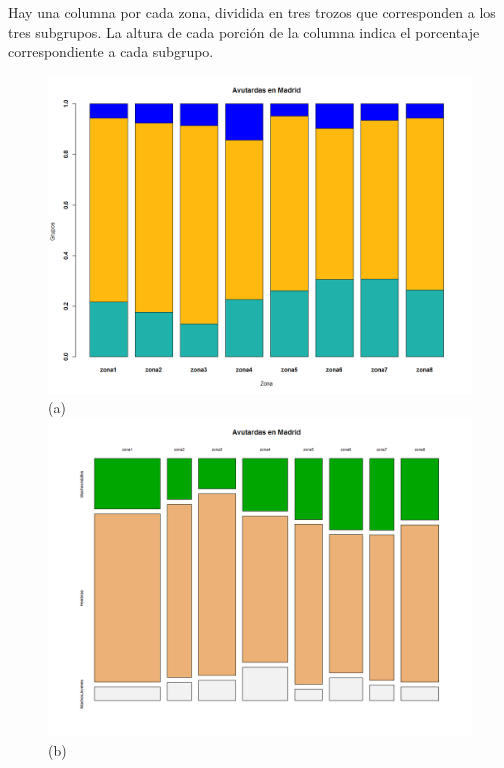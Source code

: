 \begin{Ejemplo}
Hay una columna por cada zona, dividida en tres trozos que corresponden a los tres subgrupos. La altura de cada porción de la columna indica el porcentaje correspondiente a cada subgrupo.
\begin{figure}[p]
\begin{center}
\begin{enColor}
\includegraphics[width=12cm]{../fig/Cap12-Avutardas-Grafico01.png}\\
(a)\\
\includegraphics[width=12cm]{../fig/Cap12-Avutardas-Grafico02.png}\\
(b)\\
\end{enColor}
\begin{bn}

\end{bn}
\end{center}
\end{figure}
\end{Ejemplo}
